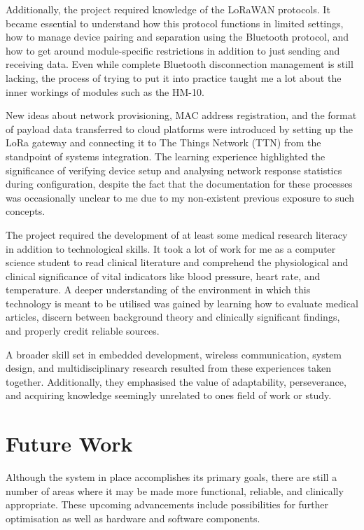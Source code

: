 Additionally, the project required knowledge of the LoRaWAN protocols. It became essential to understand how this protocol functions in limited settings, how to manage device pairing and separation using the Bluetooth protocol, and how to get around module-specific restrictions in addition to just sending and receiving data. Even while complete Bluetooth disconnection management is still lacking, the process of trying to put it into practice taught me a lot about the inner workings of modules such as the HM-10.

New ideas about network provisioning, MAC address registration, and the format of payload data transferred to cloud platforms were introduced by setting up the LoRa gateway and connecting it to The Things Network (TTN) from the standpoint of systems integration. The learning experience highlighted the significance of verifying device setup and analysing network response statistics during configuration, despite the fact that the documentation for these processes was occasionally unclear to me due to my non-existent previous exposure to such concepts.

The project required the development of at least some medical research literacy in addition to technological skills. It took a lot of work for me as a computer science student to read clinical literature and comprehend the physiological and clinical significance of vital indicators like blood pressure, heart rate, and temperature. A deeper understanding of the environment in which this technology is meant to be utilised was gained by learning how to evaluate medical articles, discern between background theory and clinically significant findings, and properly credit reliable sources.

A broader skill set in embedded development, wireless communication, system design, and multidisciplinary research resulted from these experiences taken together. Additionally, they emphasised the value of adaptability, perseverance, and acquiring knowledge seemingly unrelated to ones field of work or study.

\section{Future Work}
Although the system in place accomplishes its primary goals, there are still a number of areas where it may be made more functional, reliable, and clinically appropriate. These upcoming advancements include possibilities for further optimisation as well as hardware and software components.

